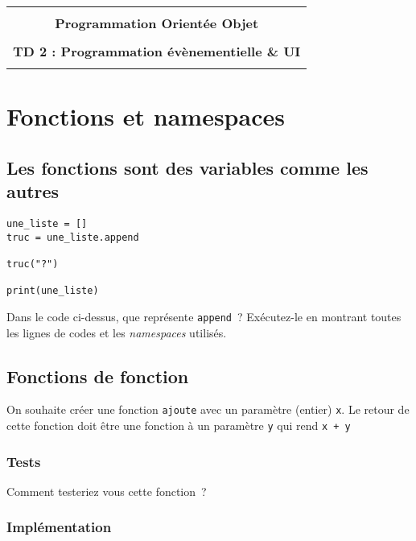 \documentclass[12pt]{article}
\begin{document}
    \begin{center}
      \begin{tabular}{c}
      \hline
    \\
        {\bf \textsf {\Large Programmation Orientée Objet}}\\
    \\
        {\bf \textsf {\Large TD 2 : Programmation évènementielle \& UI}}\\
    \\
        \hline
      \end{tabular}
    \end{center}
    \vspace{15mm}

\section{Fonctions et namespaces}

\subsection{Les fonctions sont des variables comme les autres}


\lstset{language=Python}
\begin{lstlisting}
une_liste = []
truc = une_liste.append

truc("?")

print(une_liste)
\end{lstlisting}




Dans le code ci-dessus, que représente \verb|append|~?
Exécutez-le  en montrant toutes les lignes de codes et les {\em namespaces} utilisés.


\subsection{Fonctions de fonction}

On souhaite créer une fonction \verb|ajoute| avec un paramètre (entier) \verb|x|. Le retour de cette fonction doit être une fonction à un paramètre \verb|y| qui rend \verb|x + y|

\subsubsection{Tests}

Comment testeriez vous cette fonction~?

\subsubsection{Implémentation}
\end{document}
